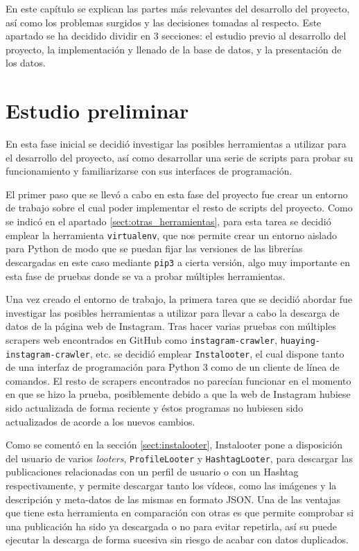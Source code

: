
En este capítulo se explican las partes más relevantes del desarrollo del proyecto, así como los problemas surgidos y las decisiones tomadas al respecto. Este apartado se ha decidido dividir en 3 secciones: el estudio previo al desarrollo del proyecto, la implementación y llenado de la base de datos, y la presentación de los datos.

\section{Estudio preliminar}
\label{sect:estudio_preliminar}

En esta fase inicial se decidió investigar las posibles herramientas a utilizar para el desarrollo del proyecto, así como desarrollar una serie de scripts para probar su funcionamiento y familiarizarse con sus interfaces de programación.

El primer paso que se llevó a cabo en esta fase del proyecto fue crear un entorno de trabajo sobre el cual poder implementar el resto de scripts del proyecto. Como se indicó en el apartado \ref{sect:otras_herramientas}, para esta tarea se decidió emplear la herramienta \texttt{virtualenv}, que nos permite crear un entorno aislado para Python de modo que se puedan fijar las versiones de las librerías descargadas en este caso mediante \texttt{pip3} a cierta versión, algo muy importante en esta fase de pruebas donde se va a probar múltiples herramientas.

Una vez creado el entorno de trabajo, la primera tarea que se decidió abordar fue investigar las posibles herramientas a utilizar para llevar a cabo la descarga de datos de la página web de Instagram. Tras hacer varias pruebas con múltiples scrapers web encontrados en GitHub como \texttt{instagram-crawler}, \texttt{huaying-instagram-crawler}, etc. se decidió emplear \texttt{Instalooter}, el cual dispone tanto de una interfaz de programación para Python 3 como de un cliente de línea de comandos. El resto de scrapers encontrados no parecían funcionar en el momento en que se hizo la prueba, posiblemente debido a que la web de Instagram hubiese sido actualizada de forma reciente y éstos programas no hubiesen sido actualizados de acorde a los nuevos cambios.

Como se comentó en la sección \ref{sect:instalooter}, Instalooter pone a disposición del usuario de varios \textit{looters}, \texttt{ProfileLooter} y \texttt{HashtagLooter}, para descargar las publicaciones relacionadas con un perfil de usuario o con un Hashtag respectivamente, y permite descargar tanto los vídeos, como las imágenes y la descripción y meta-datos de las mismas en formato JSON. Una de las ventajas que tiene esta herramienta en comparación con otras es que permite comprobar si una publicación ha sido ya descargada o no para evitar repetirla, así su puede ejecutar la descarga de forma sucesiva sin riesgo de acabar con datos duplicados.

